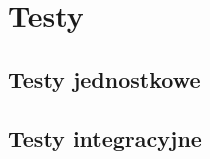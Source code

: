 \documentclass[../main.tex]{subfiles}
\begin{document}
\section{Testy}

\subsection{Testy jednostkowe}
\subsection{Testy integracyjne}
\end{document}

